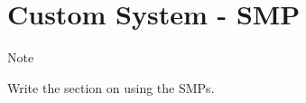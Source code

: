 \hypertarget{custom-system---smp}{%
\section{Custom System - SMP}\label{custom-system---smp}}

Note

Write the section on using the SMPs.
